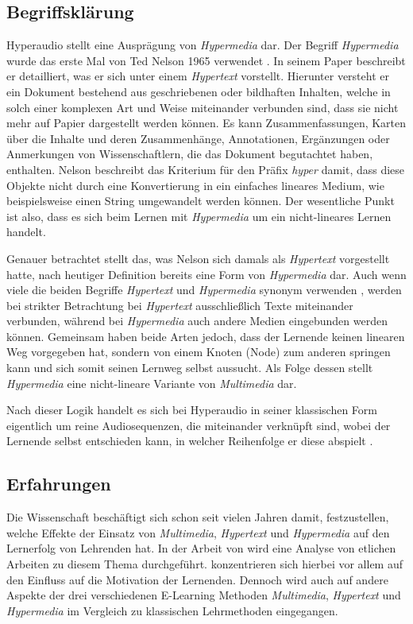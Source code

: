 \subsection{Begriffsklärung}
Hyperaudio stellt eine Ausprägung von \textit{Hypermedia} dar. Der Begriff \textit{Hypermedia} wurde das erste Mal von Ted Nelson 1965 verwendet \citep{nelson1965complex}. In seinem Paper beschreibt er detailliert, was er sich unter einem \textit{Hypertext} vorstellt. Hierunter versteht er ein Dokument bestehend aus geschriebenen oder bildhaften Inhalten, welche in solch einer komplexen Art und Weise miteinander verbunden sind, dass sie nicht mehr auf Papier dargestellt werden können. Es kann Zusammenfassungen, Karten über die Inhalte und deren Zusammenhänge, Annotationen, Ergänzungen oder Anmerkungen von Wissenschaftlern, die das Dokument begutachtet haben, enthalten. Nelson beschreibt das Kriterium für den Präfix \textit{hyper} damit, dass diese Objekte nicht durch eine Konvertierung in ein einfaches lineares Medium, wie beispielsweise einen String umgewandelt werden können. Der wesentliche Punkt ist also, dass es sich beim Lernen mit \textit{Hypermedia} um ein nicht-lineares Lernen handelt.

Genauer betrachtet stellt das, was Nelson sich damals als \textit{Hypertext} vorgestellt hatte, nach heutiger Definition bereits eine Form von \textit{Hypermedia} dar. Auch wenn viele die beiden Begriffe \textit{Hypertext} und \textit{Hypermedia} synonym verwenden \citep{nielsen2013multimedia}, werden bei strikter Betrachtung bei \textit{Hypertext} ausschließlich Texte miteinander verbunden, während bei \textit{Hypermedia} auch andere Medien eingebunden werden können. Gemeinsam haben beide Arten jedoch, dass der Lernende keinen linearen Weg vorgegeben hat, sondern von einem Knoten (Node) zum anderen springen kann und sich somit seinen Lernweg selbst aussucht. Als Folge dessen stellt \textit{Hypermedia} eine nicht-lineare Variante von \textit{Multimedia} dar.

Nach dieser Logik handelt es sich bei Hyperaudio in seiner klassischen Form eigentlich um reine Audiosequenzen, die miteinander verknüpft sind, wobei der Lernende selbst entschieden kann, in welcher Reihenfolge er diese abspielt \citep{zumbach2006learning}.

\subsection{Erfahrungen}
Die Wissenschaft beschäftigt sich schon seit vielen Jahren damit, festzustellen, welche Effekte der Einsatz von \textit{Multimedia}, \textit{Hypertext} und \textit{Hypermedia} auf den Lernerfolg von Lehrenden hat. In der Arbeit von \cite{moos2010multimedia} wird eine Analyse von etlichen Arbeiten zu diesem Thema durchgeführt. \cite{moos2010multimedia} konzentrieren sich hierbei vor allem auf den Einfluss auf die Motivation der Lernenden. Dennoch wird auch auf andere Aspekte der drei verschiedenen E-Learning Methoden \textit{Multimedia}, \textit{Hypertext} und  \textit{Hypermedia} im Vergleich zu klassischen Lehrmethoden eingegangen.

